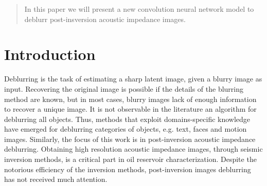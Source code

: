 \documentclass[conference,compsoc]{IEEEtran}
\begin{document}




\maketitle

\begin{abstract}
In this paper we will present a new convolution neural network
model to deblurr post-insversion acoustic impedance images.

\end{abstract}





%
\IEEEpeerreviewmaketitle

\section{Introduction}
Deblurring is the task of estimating a sharp latent image,
given a blurry image as input. Recovering the original image
is possible if the details of the blurring method are known, but
in most cases, blurry images lack of enough information
to recover a unique image. It is not observable in the literature
an algorithm for deblurring all objects. Thus, methods that exploit
domains-specific knowledge have emerged for deblurring
categories of objects, e.g. text, faces and motion images. Similarly,
the focus of this work is in post-inversion acoustic impedance deblurring.
Obtaining high resolution acoustic impedance images, through seismic inversion methods,
is a critical part in oil reservoir characterization.
Despite the notorious efficiency of the inversion methods,
post-inversion images deblurring has not received much attention.
\end{document}
